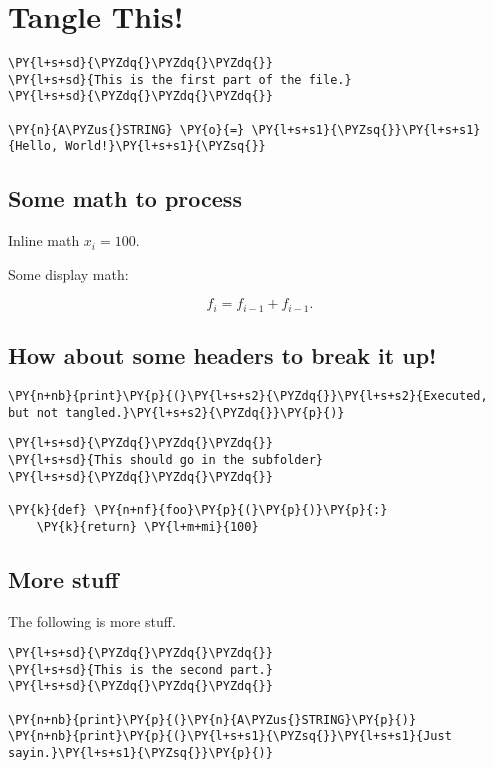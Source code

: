 \section{Tangle This!}

\begin{Verbatim}[commandchars=\\\{\}]
\PY{l+s+sd}{\PYZdq{}\PYZdq{}\PYZdq{}}
\PY{l+s+sd}{This is the first part of the file.}
\PY{l+s+sd}{\PYZdq{}\PYZdq{}\PYZdq{}}

\PY{n}{A\PYZus{}STRING} \PY{o}{=} \PY{l+s+s1}{\PYZsq{}}\PY{l+s+s1}{Hello, World!}\PY{l+s+s1}{\PYZsq{}}
\end{Verbatim}


\subsection{Some math to process}


Inline math $x_i = 100$.


Some display math:


\[
  f_i = f_{i-1} + f_{i-1}.
\]

\subsection{How about some headers to break it up!}

\begin{Verbatim}[commandchars=\\\{\}]
\PY{n+nb}{print}\PY{p}{(}\PY{l+s+s2}{\PYZdq{}}\PY{l+s+s2}{Executed, but not tangled.}\PY{l+s+s2}{\PYZdq{}}\PY{p}{)}
\end{Verbatim}


\begin{Verbatim}[commandchars=\\\{\}]
\PY{l+s+sd}{\PYZdq{}\PYZdq{}\PYZdq{}}
\PY{l+s+sd}{This should go in the subfolder}
\PY{l+s+sd}{\PYZdq{}\PYZdq{}\PYZdq{}}

\PY{k}{def} \PY{n+nf}{foo}\PY{p}{(}\PY{p}{)}\PY{p}{:}
    \PY{k}{return} \PY{l+m+mi}{100}
\end{Verbatim}


\subsection{More stuff}


The following is more stuff.

\begin{Verbatim}[commandchars=\\\{\}]
\PY{l+s+sd}{\PYZdq{}\PYZdq{}\PYZdq{}}
\PY{l+s+sd}{This is the second part.}
\PY{l+s+sd}{\PYZdq{}\PYZdq{}\PYZdq{}}

\PY{n+nb}{print}\PY{p}{(}\PY{n}{A\PYZus{}STRING}\PY{p}{)}
\PY{n+nb}{print}\PY{p}{(}\PY{l+s+s1}{\PYZsq{}}\PY{l+s+s1}{Just sayin.}\PY{l+s+s1}{\PYZsq{}}\PY{p}{)}
\end{Verbatim}
